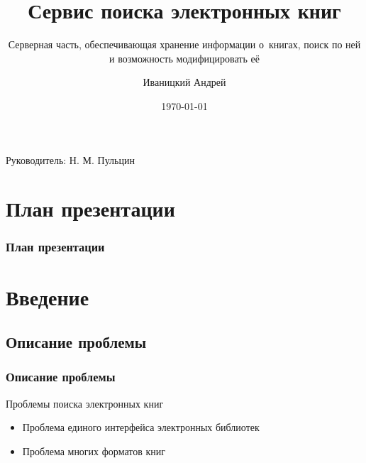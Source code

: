 \documentclass[utf8,handout]{beamer}
\title{Сервис поиска электронных книг}
\subtitle{Серверная часть, обеспечивающая хранение информации о~книгах, поиск по ней и возможность модифицировать её}
\author{Иваницкий Андрей}
\institute{Санкт-Петербургский Академический Университет РАН}
\date{\today}
\begin{document}
\begin{frame}
	\titlepage
	\begin{flushright}
    Руководитель: Н. М. Пульцин

  \end{flushright}
\end{frame}

\section*{План презентации}
	\begin{frame}
		\frametitle{План презентации}
		\tableofcontents[pausesections]
	\end{frame}

\section{Введение}
\subsection{Описание проблемы}
  \begin{frame}

    \frametitle{Описание проблемы}
      Проблемы поиска электронных книг
	      \begin{itemize}
            \item Проблема единого интерфейса электронных библиотек
            \item Проблема многих форматов книг
	      \end{itemize}
  \end{frame}

%
%
\end{document}
